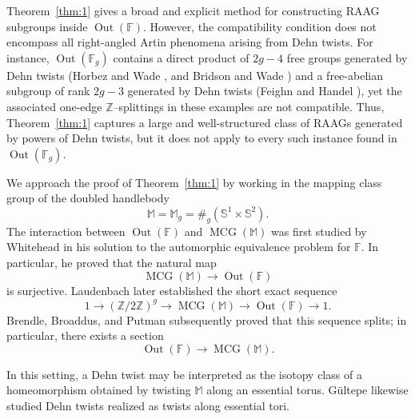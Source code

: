 \documentclass[12pt,a4paper]{amsart}
\numberwithin{equation}{section}
\DeclareMathOperator{\MCG}{MCG}
\DeclareMathOperator{\Out}{Out}
\newcommand{\FF}{\mathbb{F}}
\newcommand{\MM}{\mathbb{M}}
\theoremstyle{plain}
\theoremstyle{definition}
\theoremstyle{remark}
\begin{document}
Theorem~\ref{thm:1} gives a broad and explicit method for constructing RAAG subgroups inside $\Out(\mathbb{F})$.
However, the compatibility condition does not encompass all right-angled Artin phenomena arising from Dehn twists.
For instance, $\Out(\mathbb{F}_g)$ contains a direct product of $2g-4$ free groups generated by Dehn twists (Horbez and Wade \cite{MR4069231}, and Bridson and Wade \cite{MR4792836}) and a free-abelian subgroup of rank $2g-3$ generated by Dehn twists (Feighn and Handel \cite{MR2496054}), yet the associated one-edge $\mathbb{Z}$--splittings in these examples are not compatible.
Thus, Theorem~\ref{thm:1} captures a large and well-structured class of RAAGs generated by powers of Dehn twists, but it does not apply to every such instance found in $\Out(\mathbb{F}_g)$.

We approach the proof of Theorem~\ref{thm:1} by working in the mapping class group of the doubled handlebody
\[
    \MM = \MM_g = \#_g(\mathbb{S}^1 \times \mathbb{S}^2).
\]
The interaction between $\Out(\FF)$ and $\MCG(\MM)$ was first studied by Whitehead \cite{MR1575455, MR1503309} in his solution to the automorphic equivalence problem for $\FF$.
In particular, he proved that the natural map
\[
    \MCG(\MM) \longrightarrow \Out(\FF)
\]
is surjective.
Laudenbach \cite{MR356056} later established the short exact sequence
\[
    1 \longrightarrow (\mathbb{Z}/2\mathbb{Z})^{g} \longrightarrow \MCG(\MM) \longrightarrow \Out(\FF) \longrightarrow 1.
\]
Brendle, Broaddus, and Putman \cite{MR4557874} subsequently proved that this sequence splits; in particular, there exists a section
\[
    \Out(\FF) \longrightarrow \MCG(\MM). 
\]

In this setting, a Dehn twist may be interpreted as the isotopy class of a homeomorphism obtained by twisting $\MM$ along an essential torus.
G{\"u}ltepe \cite{MR3677931} likewise studied Dehn twists realized as twists along essential tori.

\end{document}
